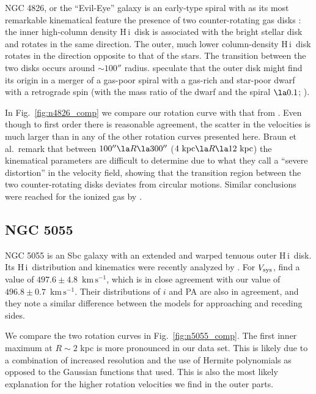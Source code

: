 \documentclass[usenatbib,usegraphicx,apjfonts,floatfix]{emulateapj}
\newcommand{\kms}{\ensuremath{\,\mbox{km}\,\mbox{s}^{-1}}}
\newcommand{\HI}{H\,{\sc i}}
\begin{document}
NGC 4826, or the ``Evil-Eye'' galaxy is an early-type spiral with as
its most remarkable kinematical feature the presence of two
counter-rotating gas disks \citep{braun94}: the inner high-column
density \HI\ disk is associated with the bright stellar disk and
rotates in the same direction. The outer, much lower column-density
\HI\ disk rotates in the direction opposite to that of the stars.  The
transition between the two disks occurs around $\sim 100''$
radius. \citet{braun94} speculate that the outer disk might find its
origin in a merger of a gas-poor spiral with a gas-rich and star-poor
dwarf with a retrograde spin (with the mass ratio of the dwarf and the
spiral $\la 0.1$; \citealt{rix95}).

In Fig.\ \ref{fig:n4826_comp} we compare our rotation curve with that from
\citet{braun94}. Even though to first order there is reasonable
agreement, the scatter in the velocities is much larger than in any of
the other rotation curves presented here.  Braun et al.\ remark that
between $100'' \la R \la 300''$ ($4\ {\rm kpc} \la R \la 12\ {\rm
  kpc}$) the kinematical parameters are difficult to determine due to
what they call a ``severe distortion'' in the velocity field, showing
that the transition region between the two counter-rotating disks
deviates from circular motions. Similar conclusions were reached for
the ionized gas by \citet{rix95}.

\subsection{NGC 5055}

NGC 5055 is an Sbc galaxy with an extended and warped tenuous outer
\HI\ disk.  Its \HI\ distribution and kinematics were recently
analyzed by \citet{battaglia}.  For $V_{\rm sys}$, \citet{battaglia}
find a value of $497.6 \pm 4.8$ \kms, which is in close agreement with
our value of $496.8 \pm 0.7$ \kms. Their distributions of $i$ and PA
are also in agreement, and they note a similar difference between the
models for approaching and receding sides.

We compare the two rotation curves in Fig.\ \ref{fig:n5055_comp}. The
first inner maximum at $R\sim 2$ kpc is more pronounced in our data
set. This is likely due to a combination of increased resolution and
the use of Hermite polynomials as opposed to the Gaussian functions that
\citet{battaglia} used. This is also the most likely explanation for
the higher rotation velocities we find in the outer parts.
\end{document}
